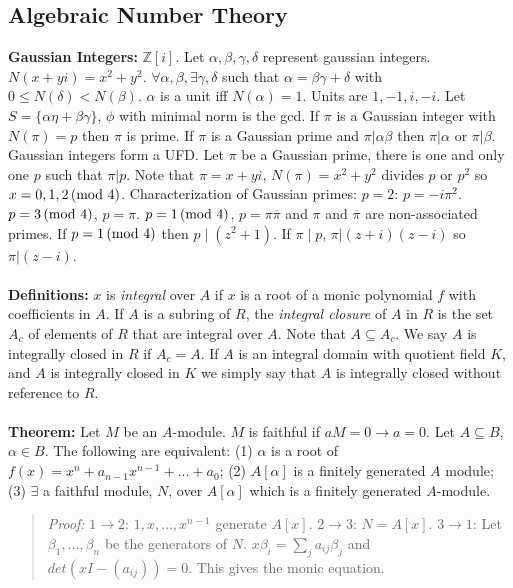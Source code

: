 \subsection{Algebraic Number Theory}
{\bf Gaussian Integers:} ${\mathbb Z}[i]$.  Let $\alpha, \beta, \gamma, \delta$ represent
gaussian integers.  $N(x+yi)= x^2 + y^2$.
$\forall \alpha, \beta, \exists \gamma, \delta$ such that
$\alpha= \beta \gamma + \delta$ with $0 \leq N(\delta) < N(\beta)$.
$\alpha$ is a unit iff $N(\alpha)=1$. Units are $1, -1, i, -i$.
Let $S= \{\alpha \eta + \beta \gamma\}$, $\phi$ with minimal norm is the
gcd.
If $\pi$ is a Gaussian integer with $N(\pi)=p$ then $\pi$ is prime.
If $\pi$ is a Gaussian prime and $\pi | \alpha \beta$ then $\pi | \alpha$ or
$\pi | \beta$.
Gaussian integers form a UFD.
Let $\pi$ be a Gaussian prime, there is one and only one $p$ such that
$\pi | p$.
Note that $\pi= x + yi$, $N(\pi)= x^2 + y^2$ divides $p$ or $p^2$ so
$x= 0, 1, 2 \thinspace \textnormal{(mod } 4 \textnormal{)}$.
Characterization of Gaussian primes: $p=2$:  $p= -i \pi^2$.
$p=3 \thinspace \textnormal{(mod } 4 \textnormal{)}$, $p=\pi$.
$p=1 \thinspace \textnormal{(mod } 4 \textnormal{)}$, $p=\pi {\overline \pi}$ and $\pi$ and
${\overline \pi}$ are non-associated primes.
If $p=1 \thinspace \textnormal{(mod } 4 \textnormal{)}$ then $p \mid (z^2+1)$.  If $\pi \mid p$,
$\pi | (z+i)(z-i)$ so $\pi | (z-i)$.
\\
\\
{\bf Definitions:}
$x$ is \emph{integral} over $A$ if $x$ is a root of a monic polynomial 
$f$ with coefficients in $A$.
If $A$ is a subring of $R$, the \emph{integral closure} of $A$ in
$R$ is the set $A_c$ of elements of $R$ 
that are integral over $A$. Note that $A \subseteq A_c$.
We say $A$ is integrally closed in $R$ if $A_c = A$. 
If $A$ is an integral domain
with quotient field $K$, and $A$ is integrally closed in $K$
we simply say
that $A$ is integrally closed without reference to $R$.
\\ 
\\
{\bf Theorem:}  Let $M$ be an $A$-module.  $M$ is faithful if 
$aM=0 \rightarrow a=0$.  Let $A \subseteq B$, $\alpha \in B$.  The following are
equivalent: (1) $\alpha$ is a root of $f(x)=x^n+a_{n-1}x^{n-1}+...+a_0$;
(2) $A[\alpha]$ is a finitely generated $A$ module; (3) $\exists$ a faithful
module, $N$, over $A[\alpha]$ which is a finitely generated $A$-module.
\begin{quote}
\emph{Proof:}
$1 \rightarrow 2$:  $1,x,\ldots, x^{n-1}$ generate $A[x]$.
$2 \rightarrow 3$:  $N=A[x]$.
$3 \rightarrow 1$:  Let $\beta_1, \ldots, \beta_n$ be the generators of $N$.
$x \beta_i = \sum_j a_{ij} \beta_j$ and $det(xI-(a_{ij}))=0$.  This gives the monic equation.
\end{quote}
